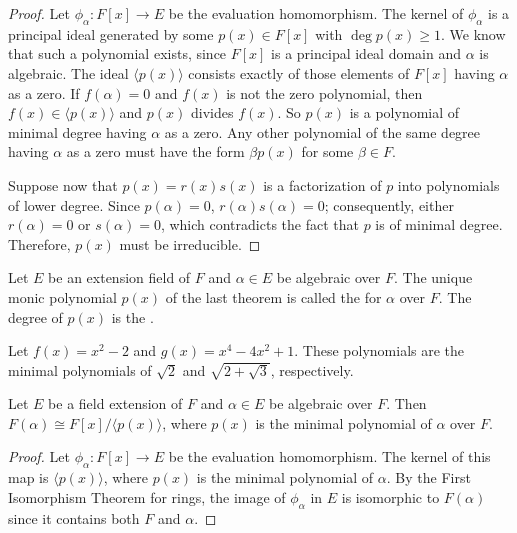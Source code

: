  
 
\begin{proof}
Let $\phi_{\alpha} : F[x] \rightarrow E$ be the evaluation
homomorphism. The kernel of $\phi_{\alpha}$ is a principal ideal
generated by some $p(x) \in F[x]$ with $\deg p(x) \geq 1$. We know
that such a polynomial exists, since $F[x]$ is a principal ideal domain
and $\alpha$ is algebraic. The ideal $\langle p(x) \rangle$ consists
exactly of those elements of $F[x]$ having $\alpha$ as a zero. If $f(
\alpha ) = 0$ and $f(x)$ is not the zero polynomial, then $f(x) \in
\langle p(x) \rangle$ and $p(x)$ divides $f(x)$. So $p(x)$ is a
polynomial of minimal degree having $\alpha$ as a zero. Any other
polynomial of the same degree having $\alpha$ as a zero must have the
form $\beta p( x)$ for some $\beta \in F$. 
 

Suppose now that $p(x) = r(x) s(x)$ is a factorization of $p$ into
polynomials of lower degree. Since $p( \alpha ) = 0$, $r( \alpha ) s(
\alpha ) = 0$; consequently, either \mbox{$r( \alpha )=0$} or
\mbox{$s( \alpha ) = 0$}, which contradicts the fact that $p$ is of
minimal degree. Therefore, $p(x)$ must be irreducible.
\end{proof}
 

\medskip
 
 
Let $E$ be an extension field of $F$ and $\alpha \in E$ be algebraic
over $F$. The unique monic polynomial $p(x)$ of the last theorem is
called the  for
$\alpha$ over $F$. The degree of $p(x)$ is the . 


\begin{example}{}
Let $f(x) = x^2 - 2$ and $g(x) = x^4 - 4 x^2 + 1$. These polynomials
are the minimal polynomials of $\sqrt{2}$ and $\sqrt{2 + \sqrt{3} }$,
respectively. 
\end{example}
 

\begin{proposition}\label{fields:min_poly_prop}
Let $E$ be a field extension of $F$ and $\alpha \in E$ be algebraic
over $F$.  Then $F( \alpha ) \cong F[x] / \langle p(x) \rangle$, where
$p(x)$ is the minimal polynomial of $\alpha$ over $F$.
\end{proposition}


\begin{proof} %
Let $\phi_{\alpha} : F[x] \rightarrow E$ be the evaluation
homomorphism. The kernel of this map is $\langle p(x) \rangle$, where $p(x)$ is the minimal polynomial  of $\alpha$. By the First Isomorphism Theorem for rings, the image of
$\phi_{\alpha}$ in $E$ is isomorphic to $F( \alpha )$ since it
contains both $F$ and $\alpha$.
\end{proof}
 

